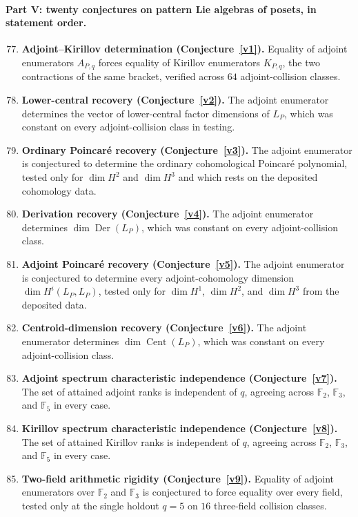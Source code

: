 \documentclass[11pt]{article}
\theoremstyle{definition}
\newcommand{\Fq}{\mathbb F}
\begin{document}
\paragraph{Part V: twenty conjectures on pattern Lie algebras of posets, in statement order.}
\begin{enumerate}\setcounter{enumi}{76}
\item \textbf{Adjoint--Kirillov determination (Conjecture~\ref{v1}).}  Equality of adjoint enumerators $A_{P,q}$ forces equality of Kirillov enumerators $K_{P,q}$, the two contractions of the same bracket, verified across $64$ adjoint-collision classes.
\item \textbf{Lower-central recovery (Conjecture~\ref{v2}).}  The adjoint enumerator determines the vector of lower-central factor dimensions of $L_P$, which was constant on every adjoint-collision class in testing.
\item \textbf{Ordinary Poincar\'e recovery (Conjecture~\ref{v3}).}  The adjoint enumerator is conjectured to determine the ordinary cohomological Poincar\'e polynomial, tested only for $\dim H^2$ and $\dim H^3$ and which rests on the deposited cohomology data.
\item \textbf{Derivation recovery (Conjecture~\ref{v4}).}  The adjoint enumerator determines $\dim\operatorname{Der}(L_P)$, which was constant on every adjoint-collision class.
\item \textbf{Adjoint Poincar\'e recovery (Conjecture~\ref{v5}).}  The adjoint enumerator is conjectured to determine every adjoint-cohomology dimension $\dim H^i(L_P,L_P)$, tested only for $\dim H^1$, $\dim H^2$, and $\dim H^3$ from the deposited data.
\item \textbf{Centroid-dimension recovery (Conjecture~\ref{v6}).}  The adjoint enumerator determines $\dim\operatorname{Cent}(L_P)$, which was constant on every adjoint-collision class.
\item \textbf{Adjoint spectrum characteristic independence (Conjecture~\ref{v7}).}  The set of attained adjoint ranks is independent of $q$, agreeing across $\Fq_2$, $\Fq_3$, and $\Fq_5$ in every case.
\item \textbf{Kirillov spectrum characteristic independence (Conjecture~\ref{v8}).}  The set of attained Kirillov ranks is independent of $q$, agreeing across $\Fq_2$, $\Fq_3$, and $\Fq_5$ in every case.
\item \textbf{Two-field arithmetic rigidity (Conjecture~\ref{v9}).}  Equality of adjoint enumerators over $\Fq_2$ and $\Fq_3$ is conjectured to force equality over every field, tested only at the single holdout $q=5$ on $16$ three-field collision classes.

\end{enumerate}
\end{document}
